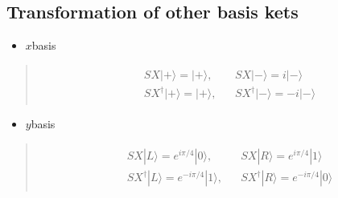\documentclass[letterpaper,10pt,english]{jupyterBook}
\begin{document}
\subsection{Transformation of other basis kets}
\label{\detokenize{q1gates/sx:transformation-of-other-basis-kets}}\begin{itemize}
\item {}
\sphinxAtStartPar
\(x\)\sphinxhyphen{}basis

\end{itemize}
\begin{quote}
\begin{equation*}
\begin{split}
\begin{align}
&SX |+\rangle = |+\rangle,  &&SX |-\rangle = i |-\rangle \\
&SX^\dagger |+\rangle = |+\rangle, &&SX^\dagger |-\rangle = -i |-\rangle
\end{align}
\end{split}
\end{equation*}\end{quote}
\begin{itemize}
\item {}
\sphinxAtStartPar
\(y\)\sphinxhyphen{}basis

\end{itemize}
\begin{quote}
\begin{equation*}
\begin{split}
\begin{align}
&SX |L\rangle = e^{i\pi/4}|0\rangle,  &&SX |R\rangle = e^{i\pi/4}|1\rangle\\
&SX^\dagger |L\rangle = e^{-i\pi/4}|1\rangle, &&SX^\dagger |R\rangle = e^{-i\pi/4}|0\rangle
\end{align}
\end{split}
\end{equation*}\end{quote}
\end{document}
